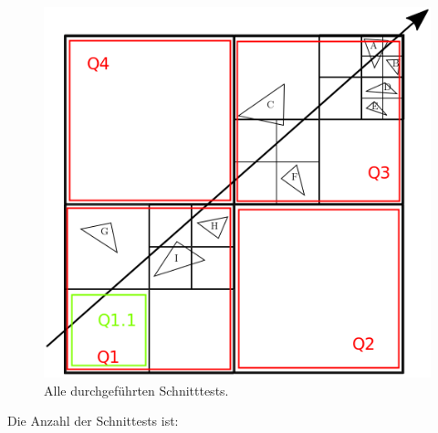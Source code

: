 \documentclass[a4paper]{scrartcl}
\begin{document}
\begin{figure}[h]
    \centering
    \includegraphics*[width=0.8\linewidth, keepaspectratio]{schnittests.png}
    \caption{Alle durchgeführten Schnitttests.}
    \label{fig:schnitttests}
\end{figure}

Die Anzahl der Schnittests ist:
\end{document}
